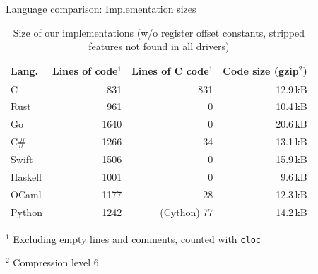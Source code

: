 \documentclass[NET,english,aspectratio=169,notitleframe]{tumbeamer}
\begin{document}
\begin{frame}{Language comparison: Implementation sizes}
\begin{table}[t]
 \setlength{\tabcolsep}{2mm}
	\centering
	\footnotesize
	\begin{tabular}{lrrr}
		\textbf{Lang.} & \textbf{Lines of code}$^1$ & \textbf{Lines of C code}$^1$  & \textbf{Code size (gzip$^2$)} \\
		\toprule
		C & 831 & 831 & 12.9\,kB  \\
		Rust & 961 & 0 & 10.4\,kB\\
		Go & 1640 & 0 & 20.6\,kB \\
		C\# & 1266 & 34 & 13.1\,kB\\
		Swift & 1506 & 0 & 15.9\,kB \\
		Haskell & 1001 & 0 &  9.6\,kB\\
		OCaml & 1177 & 28 &  12.3\,kB\\
		Python & 1242 & (Cython) 77 &14.2\,kB \\
		\bottomrule
	\end{tabular}
	\begin{tablenotes}
	\item $^1$ Excluding empty lines and comments, counted with \texttt{cloc}
	\item $^2$ Compression level 6
	\end{tablenotes}
	\caption{Size of our implementations (w/o register offset constants, stripped features not found in all drivers)}
	\label{tbl:lang-lines}
	\vspace{-3em}
\end{table}
\end{frame}
\end{document}
